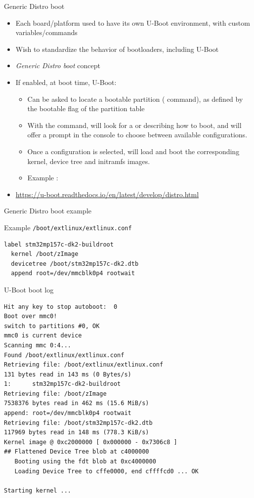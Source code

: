 \begin{frame}{Generic Distro boot}
  \begin{itemize}
  \item Each board/platform used to have its own U-Boot environment,
    with custom variables/commands
  \item Wish to standardize the behavior of bootloaders, including
    U-Boot
  \item {\em Generic Distro boot} concept
  \item If enabled, at boot time, U-Boot:
    \begin{itemize}
    \item Can be asked to locate a bootable partition ( command),
          as defined by the bootable flag of the partition table
    \item With the  command, will look for a
           or 
	  describing how to boot, and will offer a prompt in the console
          to choose between available configurations.
    \item Once a configuration is selected, will load and boot the
          corresponding kernel, device tree and initramfs images.
    \item Example :\\
    \end{itemize}
  \item \url{https://u-boot.readthedocs.io/en/latest/develop/distro.html}
  \end{itemize}
\end{frame}

\begin{frame}[fragile]{Generic Distro boot example}
  \begin{block}{Example {\tt /boot/extlinux/extlinux.conf}}
    {\tiny
\begin{verbatim}
label stm32mp157c-dk2-buildroot
  kernel /boot/zImage
  devicetree /boot/stm32mp157c-dk2.dtb
  append root=/dev/mmcblk0p4 rootwait
\end{verbatim}
    }
  \end{block}

  \begin{block}{U-Boot boot log}
    {\tiny
\begin{verbatim}
Hit any key to stop autoboot:  0
Boot over mmc0!
switch to partitions #0, OK
mmc0 is current device
Scanning mmc 0:4...
Found /boot/extlinux/extlinux.conf
Retrieving file: /boot/extlinux/extlinux.conf
131 bytes read in 143 ms (0 Bytes/s)
1:      stm32mp157c-dk2-buildroot
Retrieving file: /boot/zImage
7538376 bytes read in 462 ms (15.6 MiB/s)
append: root=/dev/mmcblk0p4 rootwait
Retrieving file: /boot/stm32mp157c-dk2.dtb
117969 bytes read in 148 ms (778.3 KiB/s)
Kernel image @ 0xc2000000 [ 0x000000 - 0x7306c8 ]
## Flattened Device Tree blob at c4000000
   Booting using the fdt blob at 0xc4000000
   Loading Device Tree to cffe0000, end cffffcd0 ... OK

Starting kernel ...
\end{verbatim}
    }
  \end{block}
\end{frame}
